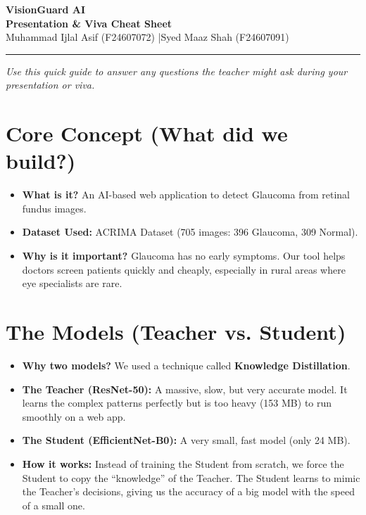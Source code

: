 \documentclass[11pt,a4paper]{article}
\begin{document}
\begin{center}
    {\Huge \textbf{VisionGuard AI}} \\[0.5cm]
    {\LARGE \textbf{Presentation \& Viva Cheat Sheet}} \\[0.5cm]
    {\large Muhammad Ijlal Asif (F24607072) \quad|\quad Syed Maaz Shah (F24607091)}
\end{center}

\vspace{0.5cm}
\hrule
\vspace{0.5cm}

\textit{Use this quick guide to answer any questions the teacher might ask during your presentation or viva.}

\section{Core Concept (What did we build?)}
\begin{itemize}
    \item \textbf{What is it?} An AI-based web application to detect Glaucoma from retinal fundus images.
    \item \textbf{Dataset Used:} ACRIMA Dataset (705 images: 396 Glaucoma, 309 Normal).
    \item \textbf{Why is it important?} Glaucoma has no early symptoms. Our tool helps doctors screen patients quickly and cheaply, especially in rural areas where eye specialists are rare.
\end{itemize}

\section{The Models (Teacher vs. Student)}
\begin{itemize}
    \item \textbf{Why two models?} We used a technique called \textbf{Knowledge Distillation}.
    \item \textbf{The Teacher (ResNet-50):} A massive, slow, but very accurate model. It learns the complex patterns perfectly but is too heavy (153 MB) to run smoothly on a web app.
    \item \textbf{The Student (EfficientNet-B0):} A very small, fast model (only 24 MB).
    \item \textbf{How it works:} Instead of training the Student from scratch, we force the Student to copy the ``knowledge'' of the Teacher. The Student learns to mimic the Teacher's decisions, giving us the accuracy of a big model with the speed of a small one.
\end{itemize}
\end{document}
